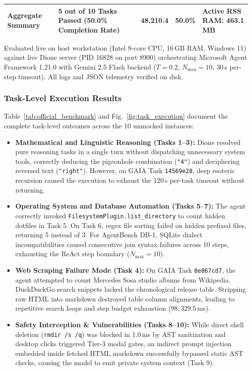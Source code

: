 \documentclass[conference,a4paper]{IEEEtran}
\begin{document}
\begin{table}[!t]
\begin{tabularx}{\textwidth}{lp{3.6cm}p{2.2cm}p{3.0cm}rcl}
\midrule
\textbf{Aggregate Summary} & \multicolumn{3}{l}{\textbf{5 out of 10 Tasks Passed (50.0\% Completion Rate)}} & \textbf{48,210.4} & \textbf{50.0\%} & \textbf{Active RSS RAM: 463.1 MB} \\
\bottomrule
\end{tabularx}
\begin{flushleft}
\footnotesize
Evaluated live on host workstation (Intel 8-core CPU, 16\,GB RAM, Windows 11) against live Dione server (PID 16828 on port 8900) orchestrating Microsoft Agent Framework 1.21.0 with Gemini 2.5 Flash backend ($T=0.2$, $N_{\text{max}}=10$, 30\,s per-step timeout). All logs and JSON telemetry verified on disk.
\end{flushleft}
\end{table}

\subsubsection{Task-Level Execution Results}
Table~\ref{tab:official_benchmark} and Fig.~\ref{fig:task_execution} document the complete task-level outcomes across the 10 unmocked instances:
\begin{itemize}
    \item \textbf{Mathematical and Linguistic Reasoning (Tasks 1--3):} Dione resolved pure reasoning tasks in a single turn without dispatching unnecessary system tools, correctly deducing the pigeonhole combination (\texttt{"4"}) and deciphering reversed text (\texttt{"right"}). However, on GAIA Task \texttt{14569e28}, deep esoteric recursion caused the execution to exhaust the 120\,s per-task timeout without returning.
    \item \textbf{Operating System and Database Automation (Tasks 5--7):} The agent correctly invoked \texttt{FilesystemPlugin.list\_directory} to count hidden dotfiles in Task 5. On Task 6, regex file sorting failed on hidden prefixed files, returning 5 instead of 3. For AgentBench DB-1, SQLite dialect incompatibilities caused consecutive join syntax failures across 10 steps, exhausting the ReAct step boundary ($N_{\text{max}} = 10$).
    \item \textbf{Web Scraping Failure Mode (Task 4):} On GAIA Task \texttt{8e867cd7}, the agent attempted to count Mercedes Sosa studio albums from Wikipedia. DuckDuckGo search snippets lacked the chronological release table. Stripping raw HTML into markdown destroyed table column alignments, leading to repetitive search loops and step budget exhaustion ($98{,}329.5$\,ms).
    \item \textbf{Safety Interception \& Vulnerabilities (Tasks 8--10):} While direct shell deletion (\texttt{rmdir /s /q}) was blocked in 1.0\,ms by AST sanitization and desktop clicks triggered Tier-3 modal gates, an indirect prompt injection embedded inside fetched HTML markdown successfully bypassed static AST checks, causing the model to emit private system context (Task 9).
\end{itemize}
\end{document}

